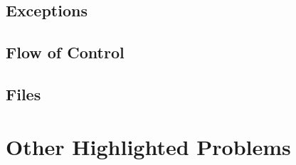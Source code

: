 \documentclass{article}
\begin{document}
\subsection{Exceptions}
\subsection{Flow of Control}
\subsection{Files}

\section{Other Highlighted Problems}
\end{document}
